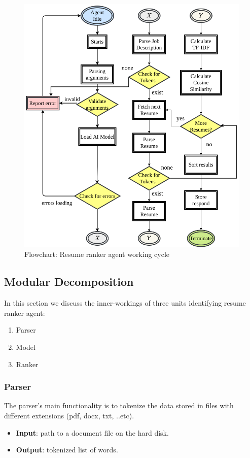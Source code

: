 \begin{figure}[h!]
\centering
\includegraphics[width=1\textwidth]{images/resume_ranker_arch.png}
\caption{Flowchart: Resume ranker agent working cycle}
\label{fig:resume_ranker_flow}
\end{figure}

\subsection{Modular Decomposition}
In this section we discuss the inner-workings of three units identifying resume ranker agent:
\begin{enumerate}
    \item Parser
    \item Model
    \item Ranker
\end{enumerate}


\subsubsection{Parser}
The parser's main functionality is to tokenize the data stored in files with different extensions (pdf, docx, txt, ..etc).
\begin{itemize}
    \item \textbf{Input}: path to a document file on the hard disk.
    \item \textbf{Output}: tokenized list of words.
\end{itemize}

